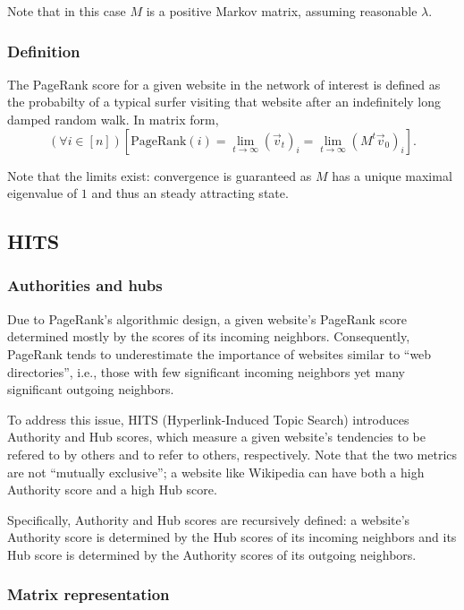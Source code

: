 \documentclass[12pt, titlepage, twoside]{amsart}
\begin{document}
Note that in this case $M$ is a positive Markov matrix, assuming reasonable $\lambda$.

\subsubsection{Definition}

The PageRank score for a given website in the network of interest is defined as the probabilty of a typical surfer
visiting that website after an indefinitely long damped random walk.
In matrix form,
\[
  (\forall i\in[n])
  \left[\mathrm{PageRank}(i) = \lim_{t\to\infty}(\vec{v}_t)_i = \lim_{t\to\infty}\left(M^t\vec{v}_0\right)_i\right].
\]

Note that the limits exist: convergence is guaranteed as $M$ has a unique maximal eigenvalue of $1$ and thus an steady
attracting state.

\subsection{HITS}

\subsubsection{Authorities and hubs}

Due to PageRank's algorithmic design, a given website's PageRank score determined mostly by the scores of its
incoming neighbors.
Consequently, PageRank tends to underestimate the importance of websites similar to ``web directories'', i.e., those
with few significant incoming neighbors yet many significant outgoing neighbors.

To address this issue, HITS (Hyperlink-Induced Topic Search) introduces Authority and Hub scores, which measure
a given website's tendencies to be refered to by others and to refer to others, respectively.
Note that the two metrics are not ``mutually exclusive''; a website like Wikipedia can have both a high Authority score
and a high Hub score.

Specifically, Authority and Hub scores are recursively defined: a website's Authority score is determined by
the Hub scores of its incoming neighbors and its Hub score is determined by the Authority scores of its outgoing
neighbors.~\cite{hits}~\cite{tanase}

\subsubsection{Matrix representation}
\end{document}
